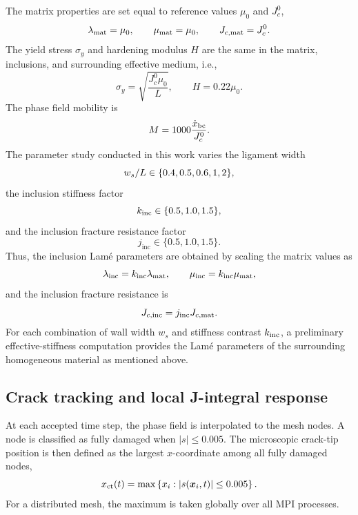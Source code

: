 \documentclass[pamm,a4paper,fleqn]{w-art}
\newcommand{\Kinc}{k_{\rm inc}}
\newcommand{\Jinc}{j_{\text{inc}}}
\begin{document}
The matrix properties are set equal to reference values \(\mu_0\) and
\(J_c^0\),
\begin{equation}
  \lambda_{\rm mat}=\mu_0,\qquad
  \mu_{\rm mat}=\mu_0,\qquad
  J_{c,\rm mat}=J_c^0.
\end{equation}
The yield stress \(\sigma_y\) and hardening modulus \(H\) are the same
in the matrix, inclusions, and surrounding effective medium, i.e.,
\begin{equation}
    \sigma_y=\sqrt{\frac{J_c^0\mu_0}{L}},\qquad
  H=0.22\mu_0.
\end{equation}
The phase field mobility is
\begin{equation}
  M=1000\frac{\dot{x}_{\rm bc}}{J_c^0}.
\end{equation}
The parameter study conducted in this work varies the ligament width
\begin{equation}
  w_s/L \in \{0.4, 0.5, 0.6, 1, 2\},
\end{equation}
the inclusion stiffness factor
\begin{equation}
  \Kinc \in \{0.5,1.0,1.5\},
\end{equation}
and the inclusion fracture resistance factor
\begin{equation}
  \Jinc \in \{0.5,1.0,1.5\}.
\end{equation}
Thus, the inclusion Lam\'e parameters are obtained by scaling the
matrix values as
\begin{equation}
  \lambda_{\rm inc}=\Kinc\lambda_{\rm mat}, \qquad
  \mu_{\rm inc}=\Kinc\mu_{\rm mat},
\end{equation}
and the inclusion fracture resistance is
\begin{equation}
  J_{c,\rm inc}=\Jinc J_{c,\rm mat}.
\end{equation}
For each combination of wall width \(w_s\) and stiffness contrast
\(\Kinc\), a preliminary
effective-stiffness computation provides the Lam\'e parameters of the
surrounding homogeneous material as mentioned above.

\subsection{Crack tracking and local J-integral response}

At each accepted time step, the phase field is interpolated to the
mesh nodes. A node is classified as fully damaged when
\(|s|\le 0.005\). The microscopic crack-tip position is then defined
as the largest \(x\)-coordinate among all fully damaged nodes,
\begin{equation}
  x_{\rm ct}(t)
  =\max\left\{
  x_i:\left|s(\boldsymbol{x}_i,t)\right|\le0.005
  \right\}.
  \label{eq:crack_tip_position}
\end{equation}
For a distributed mesh, the maximum is taken globally over all MPI
processes.
\end{document}
